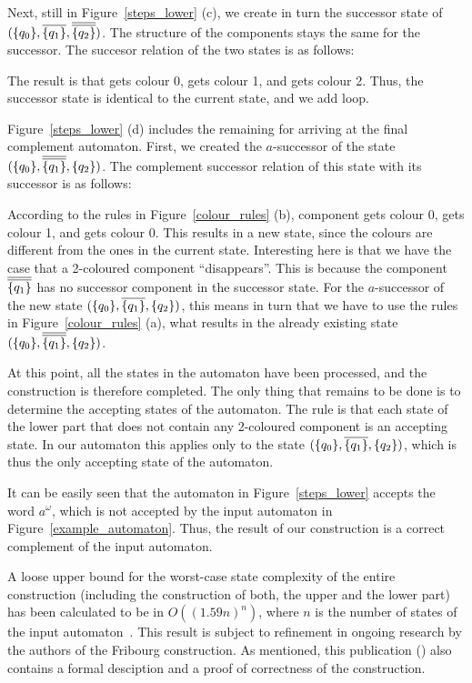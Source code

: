 Next, still in Figure~\ref{steps_lower} (c), we create in turn the successor state of $(\qm0, \cl1{\qm1}, \cl2{\qm2})$. The structure of the components stays the same for the successor. The succesor relation of the two states is as follows:

\begin{center}
\PredCompsTwo
\end{center}

The result is that  gets colour 0,  gets colour 1, and  gets colour 2. Thus, the successor state is identical to the current state, and we add loop.

Figure~\ref{steps_lower} (d) includes the remaining for arriving at the final complement automaton. First, we created the $a$-successor of the state $(\qm0, \cl2{\qm1}, \qm2)$. The complement successor relation of this state with its successor is as follows:

\begin{center}
\PredCompsThree
\end{center}

According to the rules in Figure~\ref{colour_rules} (b), component  gets colour 0,  gets colour 1, and  gets colour 0. This results in a new state, since the colours are different from the ones in the current state. Interesting here is that we have the case that a 2-coloured component ``disappears''. This is because the component $\cl2{\qm1}$ has no successor component in the successor state. For the $a$-successor of the new state $(\qm0, \cl1{\qm1}, \qm2)$, this means in turn that we have to use the rules in Figure~\ref{colour_rules} (a), what results in the already existing state $(\qm0, \cl2{\qm1}, \qm2)$.

At this point, all the states in the automaton have been processed, and the construction is therefore completed. The only thing that remains to be done is to determine the accepting states of the automaton. The rule is that each state of the lower part that does not contain any 2-coloured component is an accepting state. In our automaton this applies only to the state $(\qm0, \cl1{\qm1}, \qm2)$, which is thus the only accepting state of the automaton.

It can be easily seen that the automaton in Figure~\ref{steps_lower} accepts the word $a^\omega$, which is not accepted by the input automaton in Figure~\ref{example_automaton}. Thus, the result of our construction is a correct complement of the input automaton.

A loose upper bound for the worst-case state complexity of the entire construction (including the construction of both, the upper and the lower part) has been calculated to be in $O((1.59n)^n)$, where $n$ is the number of states of the input automaton~\cite{2014_joel_ulrich}. This result is subject to refinement in ongoing research by the authors of the Fribourg construction. As mentioned, this publication (\cite{2014_joel_ulrich}) also contains a formal desciption and a proof of correctness of the construction.


